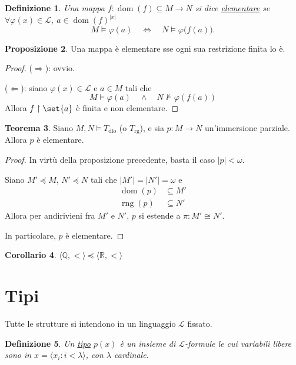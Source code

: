 \documentclass[10pt]{article}
\newcommand{\card}[1]{\left\vert #1 \right\vert}
\newcommand{\1}{\mathds{1}}
\newcommand{\R}{\mathds{R}}
\newcommand{\Q}{\mathds{Q}}
\theoremstyle{definition}%
\newtheorem{thm}{Teorema}[section]
\newtheorem{prop}[thm]{Proposizione}
\newtheorem{cor}[thm]{Corollario}
\theoremstyle{plain}
\newtheorem{definizione}[thm]{Definizione}
\theoremstyle{remark}
\newcommand{\Tdlo}{T_{\text{dlo}}}
\newcommand{\Trg}{T_{\text{rg}}}
\begin{document}
\begin{definizione}
Una mappa \(f:\operatorname{dom}(f) \subseteq M\to N\) si dice \uline{elementare} se \(\forall \varphi(x) \in \mathcal{L}\), \(a \in \operatorname{dom}(f)^{|x|}\)
\begin{equation*}
M\vDash\varphi(a)\quad\iff\quad N\vDash\varphi\big(f(a)\big).
\end{equation*}
\end{definizione}

\begin{prop}
Una mappa è elementare sse ogni sua restrizione finita lo è.
\end{prop}
\begin{proof}
(\(\Rightarrow\)): ovvio.

(\(\Leftarrow\)): siano \(\varphi(x) \in \mathcal{L}\) e \(a \in M\) tali che
\begin{equation*}
M\vDash\varphi(a)\quad \land \quad N\not\vDash\varphi(f(a))
\end{equation*}
Allora \(f\upharpoonright \set{a}\) è finita e non elementare.
\end{proof}

\begin{thm}
Siano \(M,N\vDash \Tdlo\) (o \(\Trg\)), e sia \(p:M\to N\) un'immersione parziale. Allora \(p\) è elementare.
\end{thm}
\begin{proof}
In virtù della proposizione precedente, basta il caso \(\card{p}<\omega\).

Siano \(M'\preceq M\), \(N'\preceq N\) tali che \(\card{M'}=\card{N'}=\omega\) e
\begin{align*}
\operatorname{dom}(p) &\subseteq M'\\
\operatorname{rng}(p) &\subseteq N'
\end{align*}
Allora per andirivieni fra \(M'\) e \(N'\), \(p\) si estende a \(\pi:M'\cong N'\).

In particolare, \(p\) è elementare.
\end{proof}
\begin{cor}
\(\langle \Q,<\rangle\preceq\langle \R,<\rangle\)
\end{cor}
\section{Tipi}
\label{sec:org8dd2e74}

Tutte le strutture si intendono in un linguaggio \(\mathcal{L}\) fissato.

\begin{definizione}
Un \uline{tipo} \(p(x)\) è un insieme di \(\mathcal{L}\)-formule le cui variabili libere sono in \(x=\langle x_{i}:i<\lambda\rangle\), con \(\lambda\) cardinale.
\end{definizione}
\end{document}
